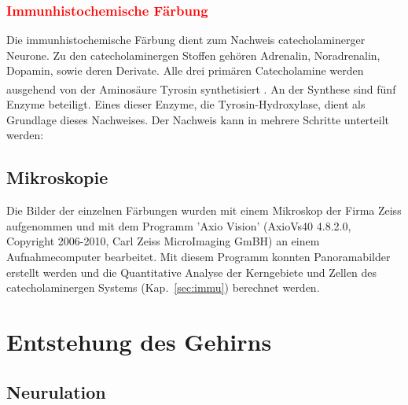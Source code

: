 \documentclass[12pt,a4paper,pdftex]{article}
\begin{document}
\subsubsection{\textcolor{red}{Immunhistochemische Färbung}}

Die immunhistochemische Färbung dient zum Nachweis catecholaminerger Neurone. Zu den catecholaminergen Stoffen gehören Adrenalin, Noradrenalin, Dopamin, sowie deren Derivate. Alle drei primären Catecholamine werden ausgehend von der Aminosäure Tyrosin synthetisiert \textsuperscript{\cite[13]{kandel2013principles}}. An der Synthese sind fünf Enzyme beteiligt. Eines dieser Enzyme, die Tyrosin-Hydroxylase, dient als Grundlage dieses Nachweises. Der Nachweis kann in mehrere Schritte unterteilt werden:\\


\subsection{Mikroskopie}

Die Bilder der einzelnen Färbungen wurden mit einem Mikroskop der Firma Zeiss aufgenommen und mit dem Programm 'Axio Vision' (AxioVs40 4.8.2.0, Copyright 2006-2010, Carl Zeiss MicroImaging GmBH) an einem Aufnahmecomputer bearbeitet. Mit diesem Programm konnten Panoramabilder erstellt werden und die Quantitative Analyse der Kerngebiete und Zellen des catecholaminergen Systems (Kap.~\ref{sec:immu}) berechnet werden.




\newpage
\section{Entstehung des Gehirns}

\subsection{Neurulation}
\label{subsec:Neurulation} 
\end{document}
